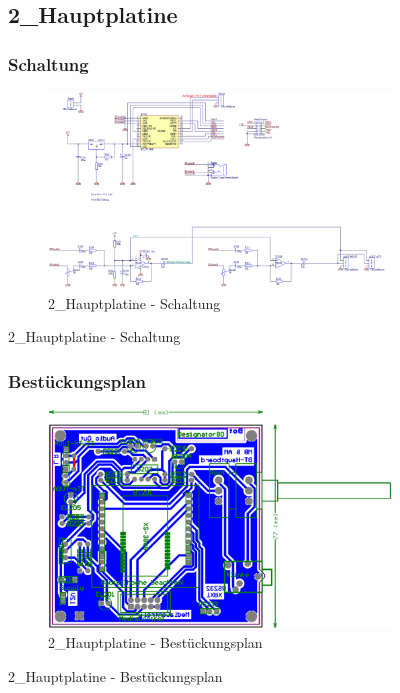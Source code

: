 \begin{figure}
	\subsection{2\_Hauptplatine}
	\subsubsection*{Schaltung}
	\begin{figure} [H]
		\centering
		\includegraphics[width=1\textwidth]{img/BTModul/hauptboard_sch.png}
		\caption{2\_Hauptplatine - Schaltung}
		\label {fig:8.10.7}
	\end{figure}
\end{figure}

\begin{figure}
	\subsubsection*{Bestückungsplan}
	\begin{figure} [H]
		\centering
		\includegraphics[width=1\textwidth]{img/BTModul/hauptboard_Best.png}
		\caption{2\_Hauptplatine - Bestückungsplan}
		\label {fig:8.10.8}
	\end{figure}
\end{figure}

